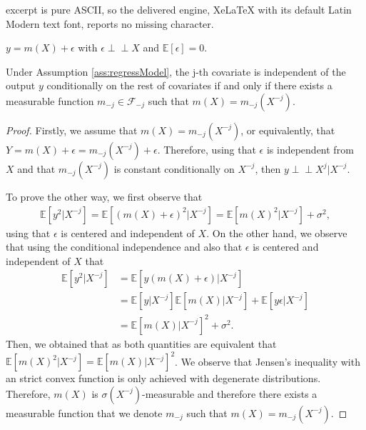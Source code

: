 \documentclass[10pt,a4paper]{amsart}
\newcommand{\e}[1]{\mathbb{E}\left[#1\right]  } %
\begin{document}
excerpt is pure ASCII, so the delivered engine, XeLaTeX with its default Latin Modern text font, reports no missing character.
\begin{assumption}[Additive noise]
    $y=m(X)+\epsilon$ with $\epsilon\perp\!\!\!\perp X$ and $\e{\epsilon}=0$.\label{ass:regressModel}
\end{assumption}

\begin{lemma}\label{lemma:nullHyp} Under Assumption \ref{ass:regressModel}, the j-th covariate is independent of the output $y$ conditionally on the rest of covariates if and only if there exists a measurable function $m_{-j}\in\mathcal{F}_{-j}$ such that $m(X)=m_{-j}(X^{-j})$.    
\end{lemma}

\begin{proof}
    Firstly, we assume that $m(X)=m_{-j}(X^{-j})$, or equivalently, that $Y=m(X)+\epsilon=m_{-j}(X^{-j})+\epsilon$. Therefore, using that $\epsilon$ is independent from $X$ and that $m_{-j}(X^{-j})$ is constant conditionally on $X^{-j}$, then $y\perp\!\!\!\perp X^{j}|X^{-j}$.


    To prove the other way, we first observe that 
    \begin{align*}
        \e{y^2|X^{-j}}=\e{(m(X)+\epsilon)^2|X^{-j}}=\e{m(X)^2|X^{-j}}+\sigma^2,
    \end{align*}
    using that $\epsilon$ is centered and independent of $X$.
    On the other hand, we observe that using the conditional independence and also that $\epsilon$ is centered and independent of $X$ that 
    \begin{align*}
        \e{y^2|X^{-j}}&=\e{y(m(X)+\epsilon)|X^{-j}}\\&=\e{y|X^{-j}}\e{m(X)|X^{-j}}+\e{y\epsilon|X^{-j}}\\&=\e{m(X)|X^{-j}}^2+\sigma^2.
    \end{align*}
    Then, we obtained that as both quantities are equivalent that $\e{m(X)^2|X^{-j}}=\e{m(X)|X^{-j}}^2$. We observe that Jensen's inequality with an strict convex function is only achieved with degenerate distributions. Therefore, $m(X)$ is $\sigma(X^{-j})$-measurable and therefore there exists a measurable function that we denote $m_{-j}$ such that $m(X)=m_{-j}(X^{-j})$. 
    
\end{proof}
\end{document}

